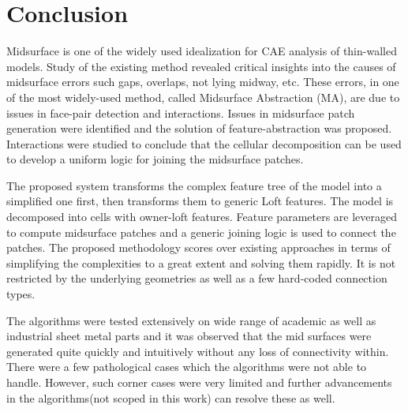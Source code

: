 \section{Conclusion}

Midsurface is one of the widely used idealization for CAE analysis of thin-walled models. Study of the existing method revealed critical insights into the causes of midsurface errors such gaps, overlaps, not lying midway, etc. These errors, in one of the most widely-used method, called Midsurface Abstraction (MA), are due to issues in face-pair detection and interactions. Issues in  midsurface patch generation were identified and the solution of feature-abstraction was proposed. Interactions were studied to conclude that the cellular decomposition can be used to develop a uniform logic for joining the midsurface patches. 

The proposed system transforms the complex feature tree of the model into a simplified one first, then  transforms them to generic Loft features. The model is decomposed into cells with owner-loft features. Feature parameters are leveraged to compute midsurface patches and a generic joining logic is used to connect the patches. The proposed methodology scores over existing approaches \cite{Chong2004, Cao2009,Cao2011,Woo2013,Boussuge2013,Boussuge2013a, Boussuge2014,Zhu2015} in terms of simplifying the complexities to a great extent and solving them rapidly.   It is not restricted by the underlying geometries as well as a few hard-coded connection types.


The algorithms were tested extensively on wide range of academic as well as industrial sheet metal parts and it was observed that the mid surfaces were generated quite quickly and intuitively without any loss of connectivity within. There were a few pathological cases which the algorithms were not able to handle. However,  such corner cases were very limited and further advancements in the algorithms(not scoped in this work) can resolve these as well.
